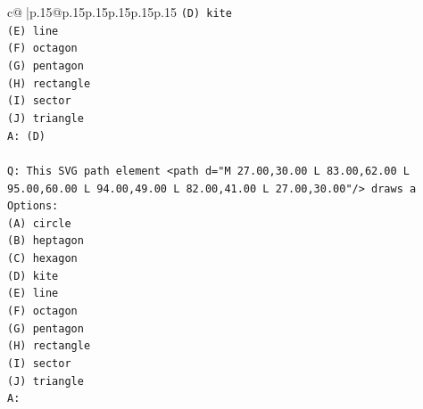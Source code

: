 \documentclass{article}
\begin{document}
{\begin{supertabular}{c@{$\;$}|p{.15\linewidth}@{}p{.15\linewidth}p{.15\linewidth}p{.15\linewidth}p{.15\linewidth}p{.15\linewidth}}
{{{\texttt{(D) kite} \\
\texttt{(E) line} \\
\texttt{(F) octagon} \\
\texttt{(G) pentagon} \\
\texttt{(H) rectangle} \\
\texttt{(I) sector} \\
\texttt{(J) triangle} \\
\texttt{A: (D)} \\
\\ 
\texttt{Q: This SVG path element <path d="M 27.00,30.00 L 83.00,62.00 L 95.00,60.00 L 94.00,49.00 L 82.00,41.00 L 27.00,30.00"/> draws a} \\
\texttt{Options:} \\
\texttt{(A) circle} \\
\texttt{(B) heptagon} \\
\texttt{(C) hexagon} \\
\texttt{(D) kite} \\
\texttt{(E) line} \\
\texttt{(F) octagon} \\
\texttt{(G) pentagon} \\
\texttt{(H) rectangle} \\
\texttt{(I) sector} \\
\texttt{(J) triangle} \\
\texttt{A:} \\
            }
        }
    }
     \\ \\


\end{supertabular}}
\end{document}
